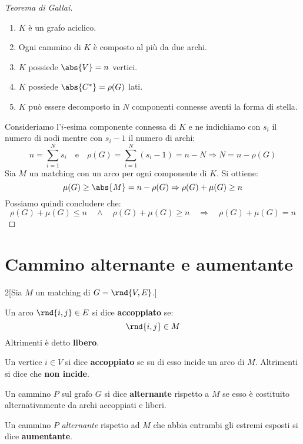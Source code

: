 \documentclass[\main/main.tex]{subfiles}
\begin{document}
\begin{proof}[Teorema di Gallai]
	\begin{enumerate}
		\item \(K\) è un grafo aciclico.
		\item Ogni cammino di \(K\) è composto al più da due archi.
		\item \(K\) possiede \(\abs{V} = n\) vertici.
		\item \(K\) possiede \(\abs{C^*} = \rho(G)\) lati.
		\item \(K\) può essere decomposto in \(N\) componenti connesse aventi la forma di stella.
	\end{enumerate}

	Consideriamo l'\(i\)-esima componente connessa di \(K\) e ne indichiamo con \(s_i\) il numero di nodi mentre con \(s_i-1\) il numero di archi:
	\[
		n = \sum_{i=1}^N s_i \quad \text{e} \quad \rho(G) = \sum_{i=1}^N (s_i -1) = n - N \Rightarrow N = n - \rho(G)
	\]
	Sia \(M\) un matching con un arco per ogni componente di \(K\). Si ottiene:
	\[
		\mu(G) \geq \abs{M} = n - \rho(G) \Rightarrow \rho(G) + \mu(G) \geq n
	\]
	Possiamo quindi concludere che:
	\[
		\rho(G) + \mu(G) \leq n \quad \land \quad \rho(G) + \mu(G) \geq n\quad \Rightarrow \quad\rho(G) + \mu(G) = n
	\]

\end{proof}
\clearpage
\section{Cammino alternante e aumentante}
\begin{multicols}{2}[Sia \(M\) un matching di \(G = \rnd{V, E}\).]
	\begin{definition}
		Un arco \(\rnd{i,j} \in E\) si dice \textbf{accoppiato} se:
		\[
			\rnd{i,j} \in M
		\]
		Altrimenti è detto \textbf{libero}.
	\end{definition}
	\begin{definition}
		Un vertice \(i \in V\) si dice \textbf{accoppiato} se su di esso incide un arco di \(M\). Altrimenti si dice che \textbf{non incide}.
	\end{definition}
	\begin{definition}
		Un cammino \(P\) sul grafo \(G\) si dice \textbf{alternante} rispetto a \(M\) se esso è costituito alternativamente da archi accoppiati e liberi.
	\end{definition}
	\begin{definition}
		Un cammino \(P\) \textit{alternante} rispetto ad \(M\) che abbia entrambi gli estremi esposti si dice \textbf{aumentante}.
	\end{definition}
\end{multicols}
\end{document}
